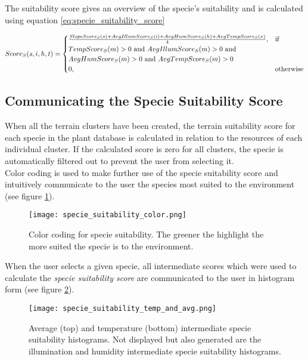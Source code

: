 The suitability score gives an overview of the specie's suitability and is calculated using equation \ref{eq:specie_suitability_score}

\begin{equation}
\begin{split}
\centering
Score_{S}(s,i,h,t) = 
\begin{cases}
	\frac{SlopeScore_{S}(s) + AvgIllumScore_{S}(i) + AvgHumScore_{S}(h) + AvgTempScore_{S}(x)}{4}, & \text{if } \\ TempScore_{S}(m) > 0 \text{ and } AvgIllumScore_{S}(m) > 0 \text{ and } \\ AvgHumScore_{S}(m) > 0 \text{ and } AvgTempScore_{S}(m) > 0 \\
    0,              & \text{otherwise}
\end{cases}
\end{split}
\label{eq:specie_suitability_score}
\end{equation}

\subsection{Communicating the Specie Suitability Score}

When all the terrain clusters have been created, the terrain suitability score for each specie in the plant database is calculated in relation to the resources of each individual cluster. If the calculated score is zero for all clusters, the specie is automatically filtered out to prevent the user from selecting it. \\

Color coding is used to make further use of the specie suitability score and intuitively communicate to the user the species most suited to the environment (see figure \ref{fig:specie_color_coding}).\\

\begin{figure}
\center
	\texttt{[image: specie\_suitability\_color.png]}
	\caption{ Color coding for specie suitability. The greener the highlight the more suited the specie is to the environment.}	
	\label{fig:specie_color_coding}
\end{figure}

When the user selects a given specie, all intermediate scores which were used to calculate the \textit{specie suitability score} are communicated to the user in histogram form (see figure \ref{fig:specie_intermediate_suitability_scores}).

\begin{figure}
\center
	\texttt{[image: specie\_suitability\_temp\_and\_avg.png]}
	\caption{ Average (top) and temperature (bottom) intermediate specie suitability histograms. Not displayed but also generated are the illumination and humidity intermediate specie suitability histograms.}	
	\label{fig:specie_intermediate_suitability_scores}
\end{figure}


